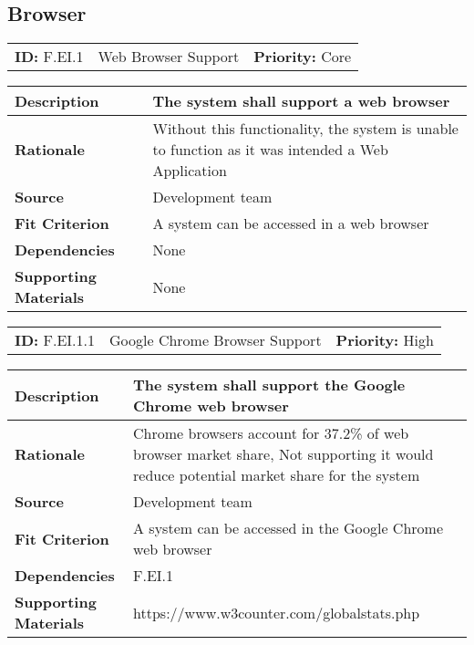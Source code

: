 \subsection{Browser}
\begin{table}
    \begin{tabularx}{\textwidth}{| l | X | l |}
        \hline
        \textbf{ID:} F.EI.1 & Web Browser Support & \textbf{Priority:} Core 
    \end{tabularx}
    \begin{tabularx}{\textwidth}{| l | X |}
        \hline
        \textbf{Description} & The system shall support a web browser \\ \hline
        \textbf{Rationale} & Without this functionality, the system is unable to function as it was intended a Web Application \\ \hline
        \textbf{Source} &  Development team\\ \hline
        \textbf{Fit Criterion} & A system can be accessed in a web browser  \\ \hline
        \textbf{Dependencies} & None \\ \hline
        \textbf{Supporting Materials} & None \\ \hline
    \end{tabularx}
\end{table}

\begin{table}[H]
    \begin{tabularx}{\textwidth}{| l | X | l |}
        \hline
        \textbf{ID:} F.EI.1.1 & Google Chrome Browser Support & \textbf{Priority:} High \\
    \end{tabularx}
    \begin{tabularx}{\textwidth}{| l | X |}
        \hline
        \textbf{Description} & The system shall support the Google Chrome web browser \\ \hline
        \textbf{Rationale} & Chrome browsers account for 37.2\% of web browser market share, Not supporting it would reduce potential market share for the system\\ \hline
        \textbf{Source} &  Development team\\ \hline
        \textbf{Fit Criterion} & A system can be accessed in the Google Chrome web browser  \\ \hline
        \textbf{Dependencies} & F.EI.1 \\ \hline
        \textbf{Supporting Materials} & https://www.w3counter.com/globalstats.php \\ \hline
    \end{tabularx}
\end{table}

